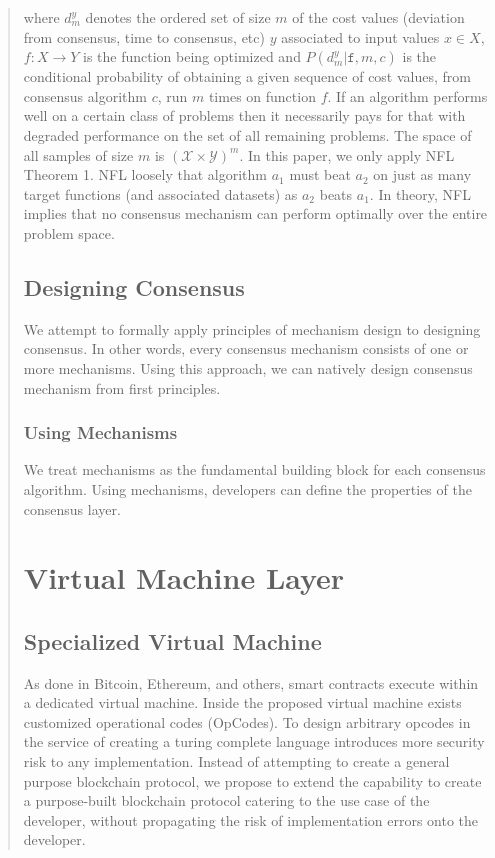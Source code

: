 \documentclass[12pt, titlepage, twocolumn]{report}
\begin{document}
\begin{quotation}
where \(\displaystyle d_{m}^{y}\) denotes the ordered set of size \(\displaystyle m\) of the cost values (deviation from consensus, time to consensus, etc) \(\displaystyle y\) associated to input values \(\displaystyle x\in X\), \(\displaystyle f:X\rightarrow Y\) is the function being optimized and \(P( d_{m}^{y} \vert \texttt{f}, m, c )\) is the conditional probability of obtaining a given sequence of cost values, from consensus algorithm \( \displaystyle c \), run \( \displaystyle m\) times on function \( \displaystyle f \). If an algorithm performs well on a certain class of problems then it necessarily pays for that with degraded performance on the set of all remaining problems. The space of all samples of size \(m\) is \((\mathcal{X} \times \mathcal{Y})^m \). In this paper, we only apply NFL Theorem 1. NFL loosely that algorithm \(a_1\) must beat \(a_2\) on just as many target functions (and associated datasets) as \(a_2\) beats \(a_1\). In theory, NFL implies that no consensus mechanism can perform optimally over the entire problem space.


\section{Designing Consensus}
We attempt to formally apply principles of mechanism design to designing consensus. In other words, every consensus mechanism consists of one or more mechanisms. Using this approach, we can natively design consensus mechanism from first principles.

\subsection{Using Mechanisms}
We treat mechanisms as the fundamental building block for each consensus algorithm. Using mechanisms, developers can define the properties of the consensus layer. 


\chapter{Virtual Machine Layer}

\section{Specialized Virtual Machine}
As done in Bitcoin, Ethereum, and others, smart contracts execute within a dedicated virtual machine. Inside the proposed virtual machine exists customized operational codes (OpCodes). To design arbitrary opcodes in the service of creating a turing complete language introduces more security risk to any implementation. Instead of attempting to create a general purpose blockchain protocol, we propose to extend the capability to create a purpose-built blockchain protocol catering to the use case of the developer, without propagating the risk of implementation errors onto the developer.


\end{quotation}
\end{document}
